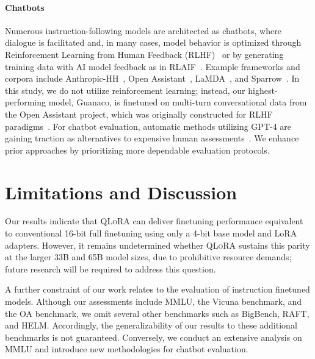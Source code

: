 \paragraph{Chatbots} Numerous instruction-following models are architected as chatbots, where dialogue is facilitated and, in many cases, model behavior is optimized through Reinforcement Learning from Human Feedback (RLHF)~\citep{christiano2017deep} or by generating training data with AI model feedback as in RLAIF~\citep{bai2022constitutional}. Example frameworks and corpora include Anthropic-HH~\citep{askell2021general,bai2022training}, Open Assistant~\citep{kopf2023openassistant}, LaMDA~\citep{thoppilan2022lamda}, and Sparrow~\citep{glaese2022improving}. In this study, we do not utilize reinforcement learning; instead, our highest-performing model, Guanaco, is finetuned on multi-turn conversational data from the Open Assistant project, which was originally constructed for RLHF paradigms~\citep{kopf2023openassistant}. For chatbot evaluation, automatic methods utilizing GPT-4 are gaining traction as alternatives to expensive human assessments~\citep{vicuna2023,peng2023instruction}. We enhance prior approaches by prioritizing more dependable evaluation protocols.

\section{Limitations and Discussion}

Our results indicate that \textsc{QLoRA} can deliver finetuning performance equivalent to conventional 16-bit full finetuning using only a 4-bit base model and LoRA adapters. However, it remains undetermined whether \textsc{QLoRA} sustains this parity at the larger 33B and 65B model sizes, due to prohibitive resource demands; future research will be required to address this question.

A further constraint of our work relates to the evaluation of instruction finetuned models. Although our assessments include MMLU, the Vicuna benchmark, and the OA benchmark, we omit several other benchmarks such as BigBench, RAFT, and HELM. Accordingly, the generalizability of our results to these additional benchmarks is not guaranteed. Conversely, we conduct an extensive analysis on MMLU and introduce new methodologies for chatbot evaluation.

